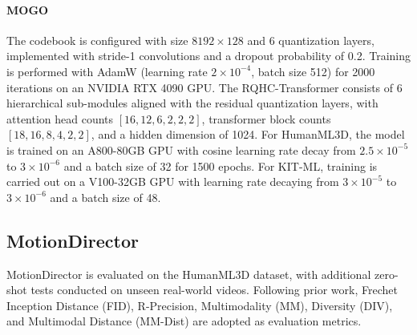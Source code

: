 \documentclass[a4paper,12pt]{article}
\begin{document}
\paragraph{MOGO}
The codebook is configured with size $8192 \times 128$ and 6 quantization layers, implemented with stride-1 convolutions and a dropout probability of 0.2. Training is performed with AdamW (learning rate $2\times10^{-4}$, batch size 512) for 2000 iterations on an NVIDIA RTX 4090 GPU. The RQHC-Transformer consists of 6 hierarchical sub-modules aligned with the residual quantization layers, with attention head counts $[16, 12, 6, 2, 2, 2]$, transformer block counts $[18, 16, 8, 4, 2, 2]$, and a hidden dimension of 1024. For HumanML3D, the model is trained on an A800-80GB GPU with cosine learning rate decay from $2.5\times10^{-5}$ to $3\times10^{-6}$ and a batch size of 32 for 1500 epochs. For KIT-ML, training is carried out on a V100-32GB GPU with learning rate decaying from $3\times10^{-5}$ to $3\times10^{-6}$ and a batch size of 48.

\subsection{MotionDirector}
MotionDirector is evaluated on the HumanML3D dataset, with additional zero-shot tests conducted on unseen real-world videos. Following prior work, Frechet Inception Distance (FID), R-Precision, Multimodality (MM), Diversity (DIV), and Multimodal Distance (MM-Dist) are adopted as evaluation metrics.
\end{document}
